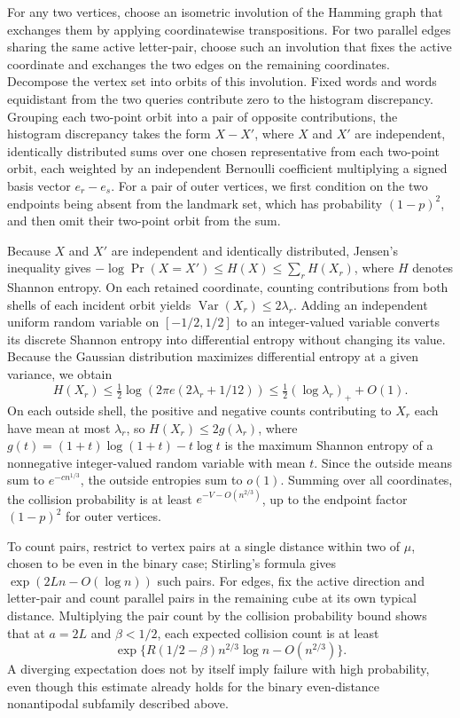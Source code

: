 For any two vertices, choose an isometric involution of the Hamming graph that exchanges them by applying coordinatewise transpositions. For two parallel edges sharing the same active letter-pair, choose such an involution that fixes the active coordinate and exchanges the two edges on the remaining coordinates. Decompose the vertex set into orbits of this involution. Fixed words and words equidistant from the two queries contribute zero to the histogram discrepancy. Grouping each two-point orbit into a pair of opposite contributions, the histogram discrepancy takes the form $X-X'$, where $X$ and $X'$ are independent, identically distributed sums over one chosen representative from each two-point orbit, each weighted by an independent Bernoulli coefficient multiplying a signed basis vector $e_r-e_s$. For a pair of outer vertices, we first condition on the two endpoints being absent from the landmark set, which has probability $(1-p)^2$, and then omit their two-point orbit from the sum.

Because $X$ and $X'$ are independent and identically distributed, Jensen's inequality gives $-\log\Pr(X=X')\le H(X)\le\sum_r H(X_r)$, where $H$ denotes Shannon entropy. On each retained coordinate, counting contributions from both shells of each incident orbit yields $\operatorname{Var}(X_r)\le2\lambda_r$. Adding an independent uniform random variable on $[-1/2,1/2]$ to an integer-valued variable converts its discrete Shannon entropy into differential entropy without changing its value. Because the Gaussian distribution maximizes differential entropy at a given variance, we obtain
\[
 H(X_r)\le\tfrac12\log(2\pi e(2\lambda_r+1/12))
 \le\tfrac12(\log\lambda_r)_++O(1).
\]
On each outside shell, the positive and negative counts contributing to $X_r$ each have mean at most $\lambda_r$, so $H(X_r)\le2g(\lambda_r)$, where $g(t)=(1+t)\log(1+t)-t\log t$ is the maximum Shannon entropy of a nonnegative integer-valued random variable with mean $t$. Since the outside means sum to $e^{-c n^{1/3}}$, the outside entropies sum to $o(1)$. Summing over all coordinates, the collision probability is at least $e^{-V-O(n^{2/3})}$, up to the endpoint factor $(1-p)^2$ for outer vertices.

To count pairs, restrict to vertex pairs at a single distance within two of $\mu$, chosen to be even in the binary case; Stirling's formula gives $\exp(2Ln-O(\log n))$ such pairs. For edges, fix the active direction and letter-pair and count parallel pairs in the remaining cube at its own typical distance. Multiplying the pair count by the collision probability bound shows that at $a=2L$ and $\beta<1/2$, each expected collision count is at least
\[
 \exp\{R(1/2-\beta)n^{2/3}\log n-O(n^{2/3})\}.
\]
A diverging expectation does not by itself imply failure with high probability, even though this estimate already holds for the binary even-distance nonantipodal subfamily described above.


